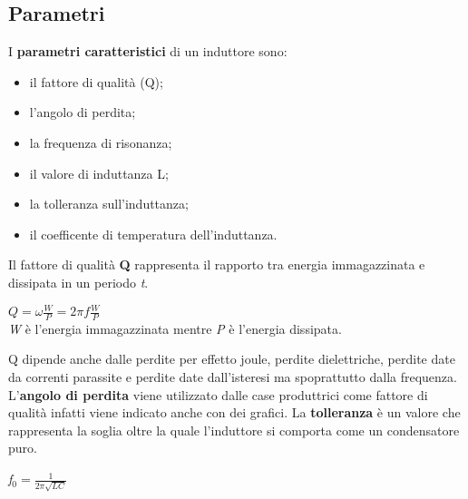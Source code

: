 \documentclass{article}
\begin{document}
\subsection{Parametri}
I \textbf{parametri caratteristici} di un induttore sono:
\begin{itemize}
    \item il fattore di qualità (Q);
    \item l'angolo di perdita;
    \item la frequenza di risonanza;
    \item il valore di induttanza L;
    \item la tolleranza sull'induttanza;
    \item il coefficente di temperatura dell'induttanza.
\end{itemize}
Il fattore di qualità \textbf{Q} rappresenta il rapporto tra energia immagazzinata e dissipata in un periodo \emph{t}.
\begin{center}
    \begin{math}
        Q=\omega\frac{W}{P}=2\pi\textit{f}\frac{W}{P}
    \end{math}\\
    \textit{W} è l'energia immagazzinata mentre \textit{P} è l'energia dissipata.
\end{center}
Q dipende anche dalle perdite per effetto joule, perdite dielettriche, perdite date da correnti parassite e perdite date dall'isteresi ma spoprattutto dalla frequenza.\\
L'\textbf{angolo di perdita} viene utilizzato dalle case produttrici come fattore di qualità infatti viene indicato anche con dei grafici.
La \textbf{tolleranza} è un valore che rappresenta la soglia oltre la quale l'induttore si comporta come un condensatore puro.
\begin{center}
    \textit{f}$_0=\frac{1}{2\pi \sqrt{LC}}$
\end{center}
\end{document}
